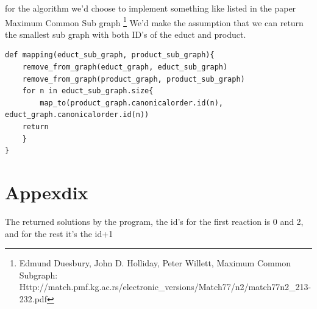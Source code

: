 \documentclass[a4paper,10pt,titlepage]{report}
\begin{document}
for the algorithm we'd choose to implement something like listed in the paper Maximum Common Sub graph \footnote{Edmund Duesbury, John D. Holliday, Peter Willett, Maximum Common Subgraph: Http://match.pmf.kg.ac.rs/electronic_versions/Match77/n2/match77n2_213-232.pdf
}
We'd make the assumption that we can return the smallest sub graph with both ID's of the educt and product.
\begin{lstlisting}
def mapping(educt_sub_graph, product_sub_graph){
    remove_from_graph(educt_graph, educt_sub_graph)
    remove_from_graph(product_graph, product_sub_graph)
    for n in educt_sub_graph.size{
        map_to(product_graph.canonicalorder.id(n), educt_graph.canonicalorder.id(n))
    return
    }
}
\end{lstlisting}

\section{Appexdix}

The returned solutions by the program, the id's for the first reaction is 0 and 2, and for the rest it's the id+1
\end{document}
